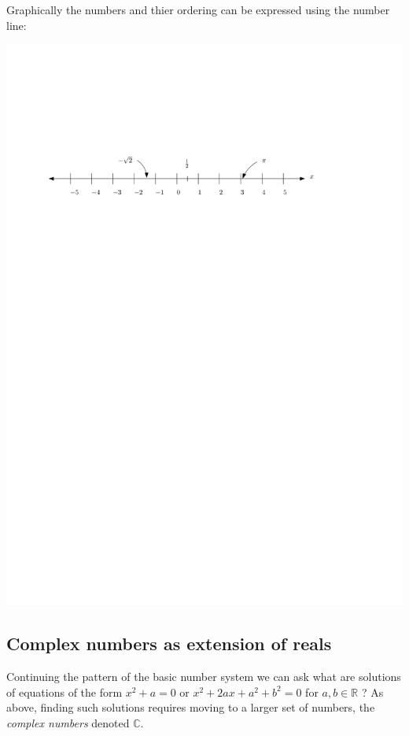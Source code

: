 Graphically the numbers and thier ordering can be expressed using the number line:

\begin{center}
  \includegraphics[scale=1]{graphics/number-line.pdf}
\end{center}

\subsection*{Complex numbers as extension of reals}

Continuing the pattern of the basic number system we can ask what are solutions of equations of the form $x^2+a = 0$ or $x^2 + 2ax +a^2 + b^2 = 0$ for $a,b \in \mathbb{R}$ ? As above, finding such solutions requires moving to a larger set of numbers, the \emph{complex numbers} denoted $\mathbb{C}$.

